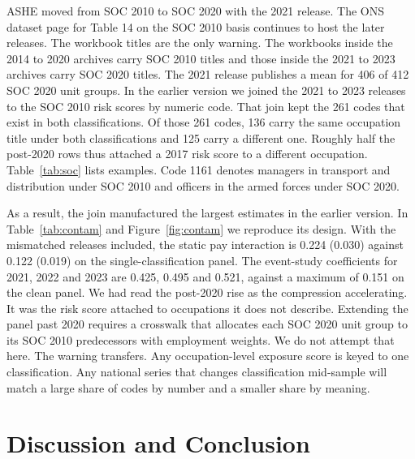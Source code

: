 \documentclass[12pt,leqno]{article}
\begin{document}
ASHE moved from SOC 2010 to SOC 2020 with the 2021 release. The ONS dataset page for Table 14 on the SOC 2010 basis continues to host the later releases. The workbook titles are the only warning. The workbooks inside the 2014 to 2020 archives carry SOC 2010 titles and those inside the 2021 to 2023 archives carry SOC 2020 titles. The 2021 release publishes a mean for 406 of 412 SOC 2020 unit groups. In the earlier version we joined the 2021 to 2023 releases to the SOC 2010 risk scores by numeric code. That join kept the 261 codes that exist in both classifications. Of those 261 codes, 136 carry the same occupation title under both classifications and 125 carry a different one. Roughly half the post-2020 rows thus attached a 2017 risk score to a different occupation. Table~\ref{tab:soc} lists examples. Code 1161 denotes managers in transport and distribution under SOC 2010 and officers in the armed forces under SOC 2020.

As a result, the join manufactured the largest estimates in the earlier version. In Table~\ref{tab:contam} and Figure~\ref{fig:contam} we reproduce its design. With the mismatched releases included, the static pay interaction is 0.224 (0.030) against 0.122 (0.019) on the single-classification panel. The event-study coefficients for 2021, 2022 and 2023 are 0.425, 0.495 and 0.521, against a maximum of 0.151 on the clean panel. We had read the post-2020 rise as the compression accelerating. It was the risk score attached to occupations it does not describe. Extending the panel past 2020 requires a crosswalk that allocates each SOC 2020 unit group to its SOC 2010 predecessors with employment weights. We do not attempt that here. The warning transfers. Any occupation-level exposure score is keyed to one classification. Any national series that changes classification mid-sample will match a large share of codes by number and a smaller share by meaning.

\section{Discussion and Conclusion}\label{sec:discussion}
\end{document}
